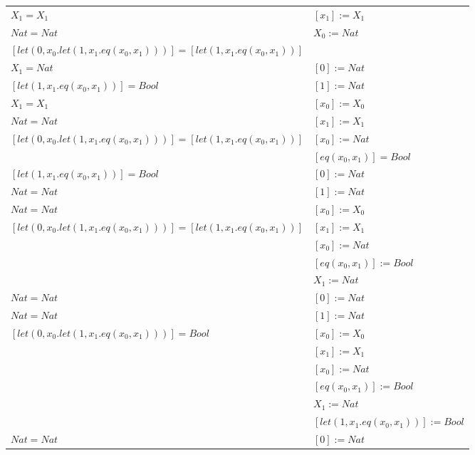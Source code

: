 \begin{exercise}
\begin{description}
\begin{center}
\begin{longtable}{ | l | l | }
                        $X_1 = X_1$  & $[x_1] := X_1$ \\
                        $Nat = Nat$ & $X_0 := Nat$ \\
                        $[let(0,x_0.let(1,x_1.eq(x_0,x_1)))] = [let(1,x_1.eq(x_0,x_1))]$ & \\
                      \hline
                        $X_1 = Nat$ & $[0] := Nat$  \\
                        $[let(1,x_1.eq(x_0,x_1))] = Bool$  & $[1] := Nat$ \\
                        $X_1 = X_1$  & $[x_0] := X_0$  \\
                        $Nat = Nat$ & $[x_1] := X_1$ \\
                        $[let(0,x_0.let(1,x_1.eq(x_0,x_1)))] = [let(1,x_1.eq(x_0,x_1))]$ &  $[x_0] := Nat$ \\
                        & $[eq(x_0,x_1)] = Bool$ \\
                      \hline
                        $[let(1,x_1.eq(x_0,x_1))] = Bool$  &  $[0] := Nat$  \\
                        $Nat = Nat$  &  $[1] := Nat$ \\
                        $Nat = Nat$ &  $[x_0] := X_0$  \\
                        $[let(0,x_0.let(1,x_1.eq(x_0,x_1)))] = [let(1,x_1.eq(x_0,x_1))]$ & $[x_1] := X_1$ \\
                        &  $[x_0] := Nat$ \\
                        &  $[eq(x_0,x_1)] := Bool$ \\
                        &  $X_1 := Nat$ \\
                      \hline
                        $Nat = Nat$  &   $[0] := Nat$ \\
                        $Nat = Nat$ & $[1] := Nat$ \\
                        $[let(0,x_0.let(1,x_1.eq(x_0,x_1)))] = Bool$ &  $[x_0] := X_0$   \\
                        & $[x_1] := X_1$  \\
                        & $[x_0] := Nat$  \\
                        & $[eq(x_0,x_1)] := Bool$  \\
                        & $X_1 := Nat$\\
                        & $[let(1,x_1.eq(x_0,x_1))] := Bool$ \\
                      \hline
                        $Nat = Nat$  &   $[0] := Nat$ \\

\end{longtable}
\end{center}
\end{description}
\end{exercise}
